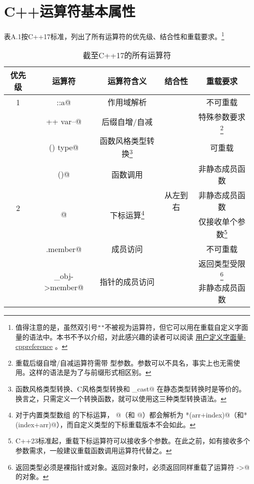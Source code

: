 \chapter{C++运算符基本属性}\label{ch:appendix_A}
表A.1按C++17标准，列出了所有运算符的优先级、结合性和重载要求。\footnote{值得注意的是，虽然双引号\texttt{""}不被视为运算符，但它可以用在重载自定义字面量的语法中。本书不予以介绍，对此感兴趣的读者可以阅读 \href{https://zh.cppreference.com/w/cpp/language/user_literal}{用户定义字面量-cppreference} 。}\par%
\begin{longtable}{|c|c|c|c|c|}
\caption{截至C++17的所有运算符}\label{tab:A-1}\\
\hline
\textbf{优先级} & \textbf{运算符} & \textbf{运算符含义} & \textbf{结合性} & \textbf{重载要求}\\
\hline\hline
1 & \lstinline@scope::a@ & 作用域解析 & \multirow{9}{*}{从左到右} & 不可重载\\
\cline{1-3}\cline{5-5}
\multirow{8}{*}{2} & \lstinline@var++ var--@ & 后缀自增/自减 &  & 特殊参数要求\footnote{重载后缀自增/自减运算符需带 \lstinline@int@ 型参数。参数可以不具名，事实上也无需使用。这样的语法是为了与前缀形式相区别。}\\
\cline{2-3}\cline{5-5}
& \lstinline@type() type{}@ & 函数风格类型转换\footnote{函数风格类型转换、C风格类型转换和 \lstinline@static_cast@ 在静态类型转换时是等价的。换言之，只需定义一个转换函数，就可以使用这三种类型转换语法。} &  & 可重载\\
\cline{2-3}\cline{5-5}
& \lstinline@fun()@ & 函数调用 &  & 非静态成员函数\\
\cline{2-3}\cline{5-5}
& \multirow{2}{*}{\lstinline@arr[index]@} & \multirow{2}{*}{下标运算\footnote{对于内置类型数组 \lstinline@arr@ 的下标运算， \lstinline@arr[index]@（和 \lstinline@index[arr]@）都会解析为 \lstinline@*(arr+index)@（和\lstinline@*(index+arr)@），而自定义类型的下标重载版本不会如此。}} &  & 非静态成员函数\\
& & & & 仅接收单个参数\footnote{C++23标准起，重载下标运算符可以接收多个参数。在此之前，如有接收多个参数需求，一般建议重载函数调用运算符代替之。}\\
\cline{2-3}\cline{5-5}
& \lstinline@obj.member@ & 成员访问 &  & 不可重载\\
\cline{2-3}\cline{5-5}
& \multirow{2}{*}{\lstinline@p_obj->member@} & \multirow{2}{*}{指针的成员访问} &  & 返回类型受限\footnote{返回类型必须是裸指针或对象。返回对象时，必须返回同样重载了运算符 \lstinline@->@ 的对象。}\\
&  &  &  & 非静态成员函数\\

\end{longtable}
